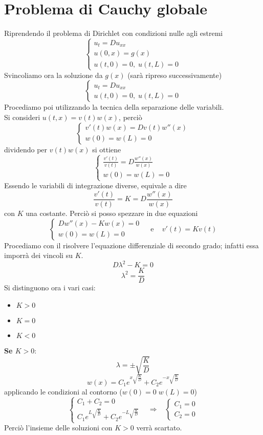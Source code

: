 \section{Problema di Cauchy globale}
Riprendendo il problema di Dirichlet con condizioni nulle agli estremi
\[
	\left\{
	\begin{array}{l}
		u_t=Du_{xx} \\
		u(0,x)=g(x) \\
		u(t,0)=0, \; u(t,L)=0
	\end{array}
	\right.
\]
Svincoliamo ora la soluzione da $g(x)$ (sar\`a ripreso successivamente)
\[
	\left\{
	\begin{array}{l}
		u_t=Du_{xx} \\
		u(t,0)=0, \; u(t,L)=0
	\end{array}
	\right.
\]
Procediamo poi utilizzando la tecnica della separazione delle variabili.\\
Si consideri $u(t,x)=v(t)w(x)$, perci\`o
\[
	\left\{
	\begin{array}{l}
		v'(t)w(x)=Dv(t)w''(x) \\
		w(0)=w(L)=0
	\end{array}
	\right.
\]
dividendo per $v(t)w(x)$ si ottiene
\[
	\left\{
	\begin{array}{l}
		\displaystyle{\frac{v'(t)}{v(t)}=D\frac{w''(x)}{w(x)} }\\
		w(0)=w(L)=0
	\end{array}
	\right.
\]
Essendo le variabili di integrazione diverse, equivale a dire
\[
	\frac{v'(t)}{v(t)}=K=D\frac{w''(x)}{w(x)}
\]
con $K$ una costante. Perci\`o si posso spezzare in due equazioni
\[
	\left\{
	\begin{array}{l}
		\displaystyle{D w''(x) - Kw(x) = 0 }\\
		w(0)=w(L)=0
	\end{array}
	\right.
	\;\;\;
	\text{ e }
	\;\;\;
	v'(t)=Kv(t)
\]
Procediamo con il risolvere l'equazione differenziale di secondo grado; 
infatti essa imporr\`a dei vincoli su $K$.
\[
	D\lambda^2-K=0
\]
\[
	\lambda^2=\frac{K}{D}
\]
Si distinguono ora i vari casi:
\begin{itemize}
	\item $K>0$
	\item $K=0$
	\item $K<0$
\end{itemize}

{\bf Se $K>0$}:
\[
	\lambda=\pm \sqrt{\frac{K}{D}}
\]
\[
	w(x)= C_1e^{x\sqrt{\frac{K}{D}}} + C_2e^{-x\sqrt{\frac{K}{D}}}
\]
applicando le condizioni al contorno ($w(0)=0 \; w(L)=0$)
\[
	\left\{
	\begin{array}{l}
		C_1+C_2=0 \\
		\displaystyle{C_1e^{L\sqrt{\frac{K}{D}}} 
			+ C_2e^{-L\sqrt{\frac{K}{D}}}}
	\end{array}
	\right.
	\;\;\;
	\Rightarrow
	\;\;\;
	\left\{
	\begin{array}{l}
		C_1=0\\
		C_2=0
	\end{array}
	\right.
\]
Perci\`o l'insieme delle soluzioni con $K>0$ verr\`a scartato.

